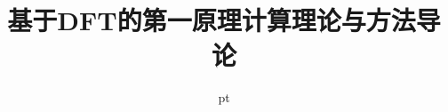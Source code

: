 \title{基于{\rm DFT}的第一原理计算理论与方法导论}

\date[\today] %
{%
 pt {\fontsize{8.2pt}{6.2pt}}
}


\subject{}
\frame
{
\titlepage
}


